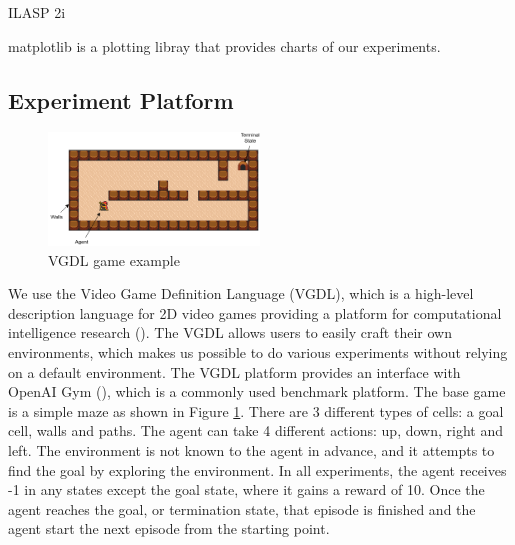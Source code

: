 ILASP 2i

matplotlib is a plotting libray that provides charts of our experiments.


\subsection{Experiment Platform}

\begin{figure}[!ht!b]
\centering
\includegraphics[width=0.5\textwidth]{./figures/env_sample}
\caption{VGDL game example}
\label{VGDL_sample}
\end{figure}

We use the Video Game Definition Language (VGDL), which is a high-level description language for 2D video games providing a platform for computational intelligence research (\cite{Schaul2013}).
The VGDL allows users to easily craft their own environments, which makes us possible to do various experiments without relying on a default environment. The VGDL platform provides an interface with OpenAI Gym (\cite{Brockman2016}), which is a commonly used benchmark platform.
The base game is a simple maze as shown in Figure \ref{VGDL_sample}.
There are 3 different types of cells: a goal cell, walls and paths. The agent can take 4 different actions: up, down, right and left.
The environment is not known to the agent in advance, and it attempts to find the goal by exploring the environment.
In all experiments, the agent receives -1 in any states except the goal state, where it gains a reward of 10.
Once the agent reaches the goal, or termination state, that episode is finished and the agent start the next episode from the starting point.

